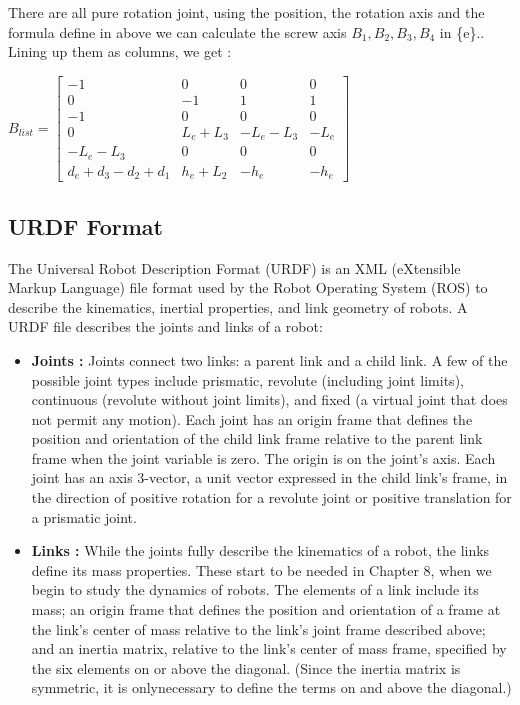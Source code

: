 \bigbreak
There are all pure rotation joint, using the position, the rotation axis and the formula define in above we can calculate the screw axis $B_1,B_2,B_3,B_4$ in \{e\}.. Lining up them as columns, we get : 

\begin{center}
    $B_{list} = 
    \begin{bmatrix}
        -1 & 0 & 0 & 0 \\
        0 & -1 & 1 & 1 \\
        -1 & 0 & 0 & 0 \\
        0 & L_e+L_3 & -L_e-L_3 & -L_e \\
        -L_e-L_3 & 0 & 0 & 0 \\
        d_e+d_3-d_2+d_1 & h_e+L_2 & -h_e & -h_e
    \end{bmatrix}
    $
\end{center}

\subsection{URDF Format}

\hspace{\parindent} The Universal Robot Description Format (URDF) is an XML (eXtensible Markup Language) file format used by the Robot Operating System (ROS) to describe the kinematics, inertial properties, and link geometry of robots. A URDF file describes the joints and links of a robot:

\begin{itemize}
    \item \textbf{Joints :} Joints connect two links: a parent link and a child link. A few of the possible joint types include prismatic, revolute (including joint limits), continuous (revolute without joint limits), and fixed (a virtual joint that does not permit any motion). Each joint has an origin frame that defines the position and orientation of the child link frame relative to the parent link frame when the joint variable is zero. The origin is on the joint's axis. Each joint has an axis 3-vector, a unit vector expressed in the child link's frame, in the direction of positive rotation for a revolute joint or positive translation for a prismatic joint.
    \item \textbf{Links :} While the joints fully describe the kinematics of a robot, the links define its mass properties. These start to be needed in Chapter 8, when we begin to study the dynamics of robots. The elements of a link include its mass; an origin frame that defines the position and orientation of a frame at the link's center of mass relative to the link's joint frame described above; and an inertia matrix, relative to the link's center of mass frame, specified by the six elements on or above the diagonal. (Since the inertia matrix is symmetric, it is onlynecessary to define the terms on and above the diagonal.)
\end{itemize}

